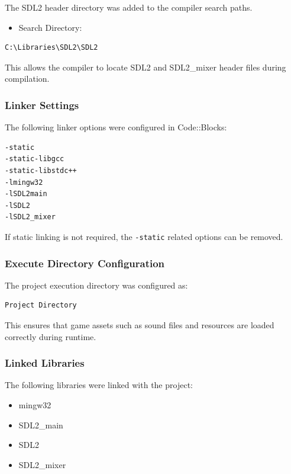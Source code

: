 \documentclass[12pt,a4paper]{report}
\begin{document}
The SDL2 header directory was added to the compiler search paths.

\begin{itemize}
    \item Search Directory:
\end{itemize}

\begin{verbatim}
C:\Libraries\SDL2\SDL2
\end{verbatim}

This allows the compiler to locate SDL2 and SDL2\_mixer header files during compilation.

\subsubsection*{Linker Settings}

The following linker options were configured in Code::Blocks:

\begin{verbatim}
-static
-static-libgcc
-static-libstdc++
-lmingw32
-lSDL2main
-lSDL2
-lSDL2_mixer
\end{verbatim}

If static linking is not required, the \texttt{-static} related options can be removed.

\subsubsection*{Execute Directory Configuration}

The project execution directory was configured as:

\begin{verbatim}
Project Directory
\end{verbatim}

This ensures that game assets such as sound files and resources are loaded correctly during runtime.

\subsubsection*{Linked Libraries}

The following libraries were linked with the project:

\begin{itemize}
    \item mingw32
    \item SDL2\_main
    \item SDL2
    \item SDL2\_mixer
\end{itemize}
\end{document}
